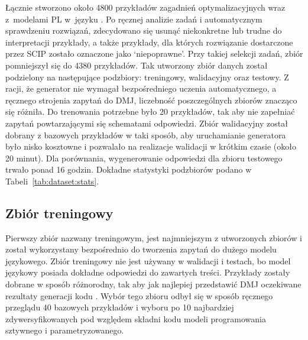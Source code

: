 Łącznie stworzono około 4800 przykładów zagadnień optymalizacyjnych wraz z~modelami PL w~języku . Po ręcznej analizie zadań i automatycznym sprawdzeniu rozwiązań, zdecydowano się usunąć niekonkretne lub trudne do interpretacji przykłady, a także przykłady, dla których rozwiązanie dostarczone przez SCIP zostało oznaczone jako `niepoprawne'. Przy takiej selekcji zadań, zbiór pomniejszył się do 4380 przykładów. Tak utworzony zbiór danych został podzielony na następujące podzbiory: treningowy, walidacyjny oraz testowy. Z racji, że generator nie wymagał bezpośredniego uczenia automatycznego, a ręcznego strojenia zapytań do DMJ, liczebność poszczególnych zbiorów znacząco się różniła. Do trenowania potrzebne było 20 przykładów, tak aby nie zapełniać zapytań powtarzającymi się schematami odpowiedzi. Zbiór walidacyjny został dobrany z bazowych przykładów w taki sposób, aby uruchamianie generatora było nisko kosztowne i pozwalało na realizacje walidacji w krótkim czasie (około 20 minut). Dla porównania, wygenerowanie odpowiedzi  dla zbioru testowego trwało ponad 16 godzin. Dokładne statystyki podzbiorów podano w Tabeli~\ref{tab:dataset:stats}. 

\subsection{Zbiór treningowy}

Pierwszy zbiór nazwany treningowym, jest najmniejszym z utworzonych zbiorów i został wykorzystany bezpośrednio do tworzenia zapytań do dużego modelu językowego. Zbiór treningowy nie jest używany w walidacji i testach, bo model językowy posiada dokładne odpowiedzi do zawartych treści. Przykłady zostały dobrane w sposób różnorodny, tak aby jak najlepiej przedstawić DMJ oczekiwane rezultaty generacji kodu . Wybór tego zbioru odbył się w sposób ręcznego przeglądu 40 bazowych przykładów i wyboru po 10 najbardziej zdywersyfikowanych pod względem składni kodu  modeli programowania sztywnego i parametryzowanego.  %

